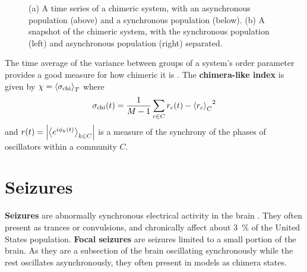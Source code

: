 \documentclass{beamer}
\newcommand{\chimera}{\chi}
\newcommand{\ordparam}{r}
\newcommand{\phase}{\phi}
\begin{document}
\begin{frame}[t]
\begin{multicols}{3}
\begin{figure}
\begin{subfigure}{0.33\columnwidth}
        \caption{}
        \label{fig:abrams_snapshot}
      \end{subfigure}%
      \caption{(a) A time series of a chimeric system, with an asynchronous population (above) and a synchronous population (below).
        (b) A snapshot of the chimeric system, with the synchronous population (left) and asynchronous population (right) separated.
      }
      \label{fig:abrams}
    \end{figure}
    The time average of the variance between groups of a system's order parameter provides a good measure for how chimeric it is \cite{Shanahan2010}.
    The \textbf{chimera-like index} is given by $\chimera = \expval{\sigma_{\text{chi}}}_{T}$
    where
    \begin{equation}
      \label{eq:chimera}
      \sigma_{\text{chi}}(t)
      =
      \frac{1}{M - 1} \sum_{c \in C}{\ordparam_{c}(t) - \expval{\ordparam_{c}}_{C}}^{2}
    \end{equation}
    and $\ordparam(t) = \abs{\expval{e^{i \phase_{k}(t)}}_{k \in C}}$ is a measure of the synchrony of the phases of oscillators within a community $C$.

    \section{Seizures}
    \textbf{Seizures} are abnormally synchronous electrical activity in the brain \cite{Kandel2013}.
    They often present as trances or convulsions, and chronically affect about \SI{3}{\percent} of the United States population.
    \textbf{Focal seizures} are seizures limited to a small portion of the brain.
    As they are a subsection of the brain oscillating synchronously while the rest oscillates asynchronously, they often present in models as chimera states.


\end{multicols}
\end{frame}
\end{document}
